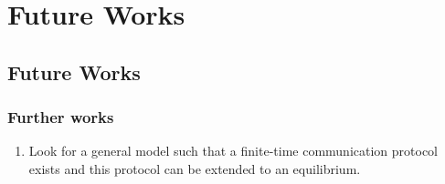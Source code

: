 \documentclass[9pt]{beamer}
\begin{document}
%
%
%
%
%
%
%
%
%
%



\section{Future Works}
\subsection{Future Works}


\begin{frame}

\frametitle{Further works}


\begin{enumerate}
\item Look for a general model such that a finite-time communication protocol exists and this protocol can be extended to an equilibrium.

\end{enumerate}
\end{frame}
\end{document}
